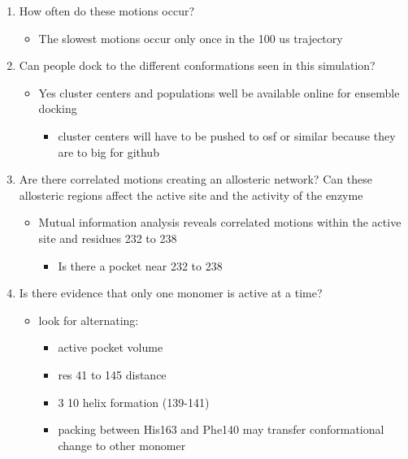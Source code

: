 \documentclass{biophys-new}
\begin{document}
\begin{enumerate}
\begin{itemize}
    \end{itemize}
    \item How often do these motions occur?
    \begin{itemize}
        \item The slowest motions occur only once in the 100 us trajectory
    \end{itemize}
    \item Can people dock to the different conformations seen in this simulation?
    \begin{itemize}
        \item Yes cluster centers and populations well be available online for ensemble docking
        \begin{itemize}
            \color{blue}
            \item cluster centers will have to be pushed to osf or similar because they are to big for github
        \end{itemize}
    \end{itemize}
    \item Are there correlated motions creating an allosteric network? Can these allosteric regions affect the active site and the activity of the enzyme
    \begin{itemize}
        \item Mutual information analysis reveals correlated motions within the active site and residues 232 to 238
        \begin{itemize}
            \color{blue}
            \item Is there a pocket near 232 to 238
        \end{itemize}
    \end{itemize}
    \item Is there evidence that only one monomer is active at a time?
     \begin{itemize}
        \item look for alternating:
        \begin{itemize}
            \color{blue}
            \item active pocket volume
            \item res 41 to 145 distance
            \item 3 10 helix formation (139-141)
            \item packing between His163 and Phe140 may transfer conformational change to other monomer
        \end{itemize}
    \end{itemize}
\end{enumerate}
\end{document}
